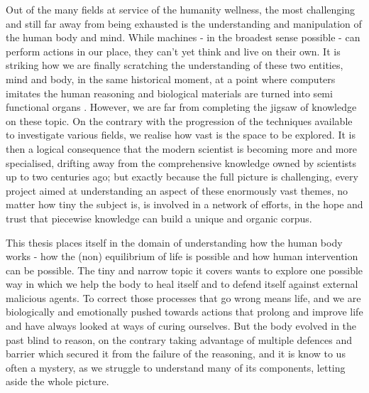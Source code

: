 \documentclass[a4paper,11pt]{extreport}
\begin{document}
Out of the many fields at service of the humanity wellness, the most challenging and still far away from being exhausted is the understanding and manipulation of the human body and mind. While machines - in the broadest sense possible - can perform actions in our place, they can't yet think and live on their own. It is striking how we are finally scratching the understanding of these two entities, mind and body, in the same historical moment, at a point where computers imitates the human reasoning \cite{AlphaGo, AIreview} and biological materials are turned into semi functional organs \cite{Rossi2018}. However, we are far from completing the jigsaw of knowledge on these topic. On the contrary with the progression of the techniques available to investigate various fields, we realise how vast is the space to be explored. It is then a logical consequence that the modern scientist is becoming more and more specialised, drifting away from the comprehensive knowledge owned by scientists up to two centuries ago; but exactly because the full picture is challenging, every project aimed at understanding an aspect of these enormously vast themes, no matter how tiny the subject is, is involved in a network of efforts, in the hope and trust that piecewise knowledge can build a unique and organic corpus.

This thesis places itself in the domain of understanding how the human body works - how the (non) equilibrium of life is possible and how human intervention can be possible. The tiny and narrow topic it covers wants to explore one possible way in which we help the body to heal itself and to defend itself against external malicious agents. To correct those processes that go wrong means life, and we are biologically and emotionally pushed towards actions that prolong and improve life and have always looked at ways of curing ourselves. But the body evolved in the past blind to reason, on the contrary taking advantage of multiple defences and barrier which secured it from the failure of the reasoning, and it is know to us often a mystery, as we struggle to understand many of its components, letting aside the whole picture.
\end{document}
